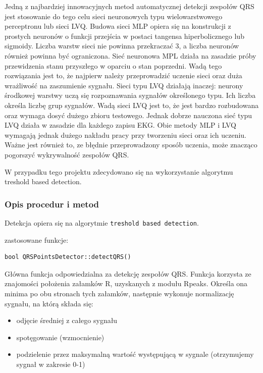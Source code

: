 \documentclass[a4paper, 11pt]{article}
\begin{document}
Jedną z najbardziej innowacyjnych metod automatycznej detekcji zespołów QRS
jest stosowanie do tego celu sieci neuronowych typu wielowarstwowego
perceptronu lub sieci LVQ. Budowa sieci MLP opiera się na konstrukcji z prostych neuronów o funkcji przejścia w postaci
tangensa hiperbolicznego lub sigmoidy. Liczba warstw sieci nie powinna
przekraczać 3, a liczba neuronów również powinna być ograniczona. 
Sieć neuronowa MPL działa na zasadzie próby przewidzenia stanu
przyszłego w oparciu o stan poprzedni. Wadą tego rozwiązania jest to, że najpierw należy przeprowadzić uczenie sieci oraz duża wrażliwość na zaszumienie sygnału.  Sieci typu LVQ działają inaczej: neurony środkowej warstwy uczą się rozpoznawania
sygnałów określonego typu. Ich liczba określa liczbę grup sygnałów.
Wadą sieci LVQ jest to, że jest bardzo rozbudowana oraz
wymaga dosyć dużego zbioru testowego. Jednak dobrze nauczona sieć typu LVQ działa w zasadzie dla każdego zapisu EKG.
Obie metody MLP i LVQ wymagają jednak
dużego nakładu pracy przy tworzeniu sieci oraz ich uczeniu. Ważne jest również to, ze błędnie przeprowadzony sposób uczenia, może znacząco pogorszyć wykrywalność zespołów QRS.

W przypadku tego projektu zdecydowano się na wykorzystanie algorytmu treshold based detection.


\subsubsection{Opis procedur i metod}
\label{sec:st_interval:procs}
Detekcja opiera się na algorytmie \verb|treshold based detection|.


zastosowane funkcje:


\begin{lstlisting}
bool QRSPointsDetector::detectQRS()
\end{lstlisting}
Główna funkcja odpowiedzialna za detekcję zespołów QRS. Funkcja korzysta ze znajomości położenia
załamków R, uzyskanych z modułu Rpeaks. Określa ona minima po obu stronach tych załamków,
następnie wykonuje normalizację sygnału, na którą składa się:
\begin{itemize}
     \item odjęcie średniej z całego sygnału
     \item spotęgowanie (wzmocnienie)
     \item podzielenie przez maksymalną wartość występującą w sygnale (otrzymujemy sygnał
w zakresie 0-1)
\end{itemize}
\end{document}
